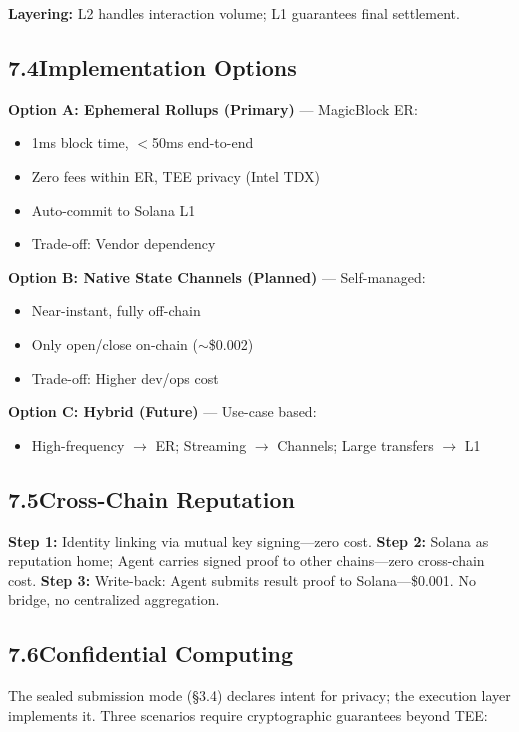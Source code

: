\documentclass[11pt,a4paper]{article}
\begin{document}
\textbf{Layering:} L2 handles interaction volume; L1 guarantees final settlement.

\subsection{7.4\quad Implementation Options}

\textbf{Option A: Ephemeral Rollups (Primary)} --- MagicBlock ER:
\begin{itemize}[noitemsep,topsep=2pt]
  \item 1ms block time, $<$50ms end-to-end
  \item Zero fees within ER, TEE privacy (Intel TDX)
  \item Auto-commit to Solana L1
  \item Trade-off: Vendor dependency
\end{itemize}

\textbf{Option B: Native State Channels (Planned)} --- Self-managed:
\begin{itemize}[noitemsep,topsep=2pt]
  \item Near-instant, fully off-chain
  \item Only open/close on-chain ($\sim$\$0.002)
  \item Trade-off: Higher dev/ops cost
\end{itemize}

\textbf{Option C: Hybrid (Future)} --- Use-case based:
\begin{itemize}[noitemsep,topsep=2pt]
  \item High-frequency $\to$ ER; Streaming $\to$ Channels; Large transfers $\to$ L1
\end{itemize}

\subsection{7.5\quad Cross-Chain Reputation}
\textbf{Step 1:} Identity linking via mutual key signing---zero cost. \textbf{Step 2:} Solana as reputation home; Agent carries signed proof to other chains---zero cross-chain cost. \textbf{Step 3:} Write-back: Agent submits result proof to Solana---\$0.001. No bridge, no centralized aggregation.

\subsection{7.6\quad Confidential Computing}

The sealed submission mode (\S3.4) declares intent for privacy; the execution layer implements it. Three scenarios require cryptographic guarantees beyond TEE:
\end{document}
